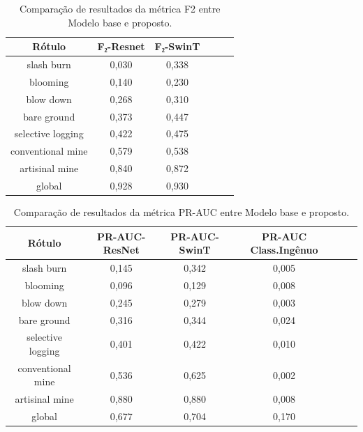 \begin{table}[h!]
    \caption{ Comparação de resultados da métrica F2 entre Modelo base e proposto.}
    \centering
\begin{tabular}{*{6}{c}}
    \toprule
    Rótulo &F₂-Resnet&F₂-SwinT \\
    \midrule
            slash burn &  0,030 &  0,338 \\ 
              blooming &  0,140 &  0,230 \\
             blow down &  0,268 &  0,310 \\
           bare ground &  0,373 &  0,447 \\
     selective logging &  0,422 &  0,475 \\
     conventional mine &  0,579 &  0,538 \\
        artisinal mine &  0,840 &  0,872 \\
                global &  0,928 &  0,930 \\
    \bottomrule
\end{tabular}
\label{table:ResultadosSwinT-F2}
\end{table}



\begin{table}[h!]
    \caption{ Comparação de resultados da métrica PR-AUC entre Modelo base e proposto.}
    \centering
\begin{tabular}{*{6}{c}}
    \toprule
    Rótulo &PR-AUC-ResNet&PR-AUC-SwinT&PR-AUC Class.Ingênuo \\
    \midrule
            slash burn &       0,145 &      0,342 &     0,005 \\
              blooming &       0,096 &      0,129 &     0,008 \\
             blow down &       0,245 &      0,279 &     0,003 \\
           bare ground &       0,316 &      0,344 &     0,024 \\
     selective logging &       0,401 &      0,422 &     0,010 \\
     conventional mine &       0,536 &      0,625 &     0,002 \\
        artisinal mine &       0,880 &      0,880 &     0,008 \\
                global &       0,677 &      0,704 &     0,170 \\
    \bottomrule
\end{tabular}
\label{table:ResultadosSwinT-PR-AUC }
\end{table}

